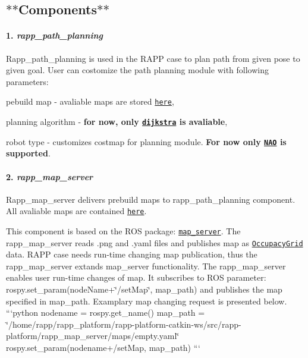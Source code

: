 

\subsection*{$\ast$$\ast$\-Components$\ast$$\ast$ }

\paragraph*{1. {\itshape rapp\-\_\-path\-\_\-planning}}

Rapp\-\_\-path\-\_\-planning is used in the R\-A\-P\-P case to plan path from given pose to given goal. User can costomize the path planning module with following parameters\-:
\begin{DoxyItemize}
\item pebuild map -\/ avaliable maps are stored \href{https://github.com/rapp-project/rapp-platform/tree/master/rapp_map_server/maps}{\tt here},
\item planning algorithm -\/ {\bfseries for now, only \href{https://en.wikipedia.org/wiki/Dijkstra%27s_algorithm}{\tt dijkstra} is avaliable},
\item robot type -\/ customizes costmap for planning module. {\bfseries For now only \href{https://www.aldebaran.com/en/humanoid-robot/nao-robot}{\tt N\-A\-O} is supported}.
\end{DoxyItemize}

\paragraph*{2. {\itshape rapp\-\_\-map\-\_\-server}}

Rapp\-\_\-map\-\_\-server delivers prebuild maps to rapp\-\_\-path\-\_\-planning component. All avaliable maps are contained \href{https://github.com/rapp-project/rapp-platform/tree/master/rapp_map_server/maps}{\tt here}.

This component is based on the R\-O\-S package\-: \href{http://wiki.ros.org/map_server}{\tt map\-\_\-server}. The rapp\-\_\-map\-\_\-server reads .png and .yaml files and publishes map as \href{http://docs.ros.org/jade/api/nav_msgs/html/msg/OccupancyGrid.html}{\tt Occupacy\-Grid} data. R\-A\-P\-P case needs run-\/time changing map publication, thus the rapp\-\_\-map\-\_\-server extands map\-\_\-server functionality. The rapp\-\_\-map\-\_\-server enables user run-\/time changes of map. It subscribes to R\-O\-S parameter\-: {\ttfamily rospy.\-set\-\_\-param(node\-Name+\char`\"{}/set\-Map\char`\"{}, map\-\_\-path)} and publishes the map specified in map\-\_\-path. Examplary map changing request is presented below. ```python nodename = rospy.\-get\-\_\-name() map\-\_\-path = \char`\"{}/home/rapp/rapp\-\_\-platform/rapp-\/platform-\/catkin-\/ws/src/rapp-\/platform/rapp\-\_\-map\-\_\-server/maps/empty.\-yaml\char`\"{} rospy.\-set\-\_\-param(nodename+/set\-Map, map\-\_\-path) ```

